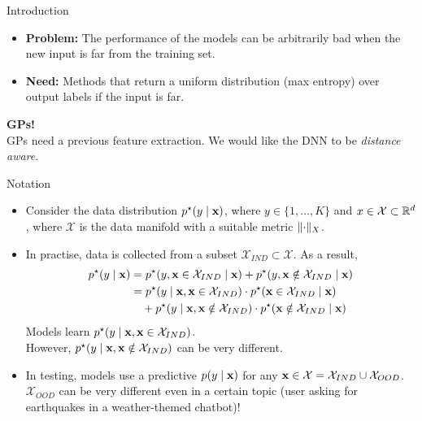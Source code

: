 \documentclass[xcolor=table]{beamer}
\newcommand{\pstar}{p^\star(y \mid \bx)}
\newcommand{\xind}{\mathcal X_{IND}}
\DeclarePairedDelimiter\norm{\lVert}{\rVert}%
\begin{document}
\begin{frame}{Introduction}

    \begin{itemize}
        \item \textbf{Problem:} The performance of the models can be arbitrarily bad when the new input is far from the training set.
        
        \pause

        \item \textbf{Need:} Methods that return a uniform distribution (max entropy) over output labels if the input is far. 
    \end{itemize}
    \pause \textbf{GPs!}\\
    
GPs need a previous feature extraction. We would like the DNN to be \emph{distance aware}.
\end{frame}


    
\begin{frame}{Notation}
\begin{itemize}
\item Consider the data distribution \(\pstar\), where \(y \in \{1,\dots,K\}\) and \(x \in \mathcal X \subset {\mathbb R}^d\), where \(\mathcal X\) is the data manifold with a suitable metric \(\norm{\cdot}_{X}\).
\pause
\item In practise, data is collected from a subset \(\xind \subset \mathcal X\). As a result,
\begin{align*}
\pstar & = p^\star(y, \bx \in \xind \mid \bx) + p^\star(y, \bx \notin \xind \mid \bx)\\ 
& = p^\star(y \mid \bx , \bx \in \xind) \cdot p^\star( \bx \in \xind \mid \bx) \\
& \quad+ p^\star(y \mid \bx , \bx \notin \xind) \cdot p^\star( \bx \notin \xind \mid \bx)
\end{align*}
Models learn \(p^\star(y \mid \bx, \bx \in \xind)\). \\
However, \(p^\star(y \mid \bx, \bx \notin \xind)\) can be very different.
\pause
\item In testing, models use a predictive \(p(y \mid {\mathbf x})\) for any \(\bx \in \mathcal X = \xind \cup \mathcal X_{OOD}\). \(\mathcal X_{OOD}\) can be very different even in a certain topic (user asking for earthquakes in a weather-themed chatbot)!
\end{itemize}

\vspace{1cm}

\end{frame}
\end{document}
